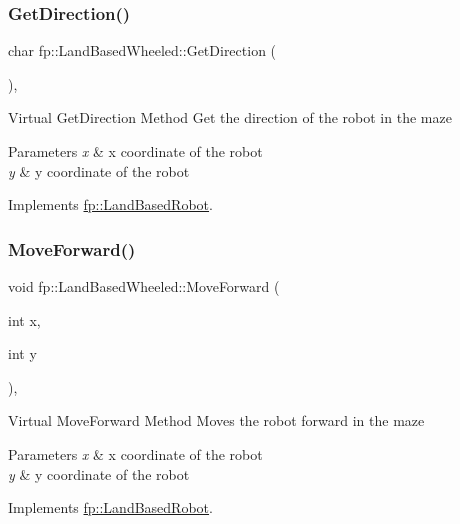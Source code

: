 \subsubsection{\texorpdfstring{Get\+Direction()}{GetDirection()}}
{\footnotesize\ttfamily char fp\+::\+Land\+Based\+Wheeled\+::\+Get\+Direction (\begin{DoxyParamCaption}{ }\end{DoxyParamCaption})\hspace{0.3cm}{\ttfamily [override]}, {\ttfamily [virtual]}}

Virtual Get\+Direction Method Get the direction of the robot in the maze 
\begin{DoxyParams}{Parameters}
{\em x} & x coordinate of the robot \\
\hline
{\em y} & y coordinate of the robot \\
\hline
\end{DoxyParams}


Implements \hyperlink{classfp_1_1_land_based_robot_a50841b6e40d4e92832770d26b427fea2}{fp\+::\+Land\+Based\+Robot}.

\mbox{\label{classfp_1_1_land_based_wheeled_a9c6a668ce9233468141516c8ea678593}} 
\subsubsection{\texorpdfstring{Move\+Forward()}{MoveForward()}}
{\footnotesize\ttfamily void fp\+::\+Land\+Based\+Wheeled\+::\+Move\+Forward (\begin{DoxyParamCaption}\item[{int}]{x,  }\item[{int}]{y }\end{DoxyParamCaption})\hspace{0.3cm}{\ttfamily [override]}, {\ttfamily [virtual]}}

Virtual Move\+Forward Method Moves the robot forward in the maze 
\begin{DoxyParams}{Parameters}
{\em x} & x coordinate of the robot \\
\hline
{\em y} & y coordinate of the robot \\
\hline
\end{DoxyParams}


Implements \hyperlink{classfp_1_1_land_based_robot_a25ed5c4c524e68cc983104a8da57599b}{fp\+::\+Land\+Based\+Robot}.

